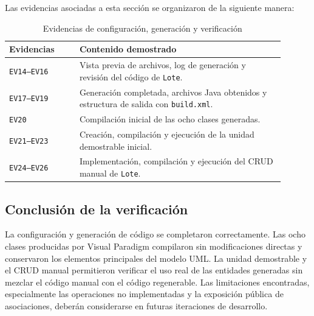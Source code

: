 Las evidencias asociadas a esta sección se organizaron de la siguiente manera:

\begin{table}[htbp]
\centering
\small
\caption{Evidencias de configuración, generación y verificación}
\begin{tabular}{|p{0.23\linewidth}|p{0.67\linewidth}|}
\hline
\textbf{Evidencias} & \textbf{Contenido demostrado} \\
\hline
\texttt{EV14--EV16} & Vista previa de archivos, log de generación y revisión del código de \texttt{Lote}. \\
\hline
\texttt{EV17--EV19} & Generación completada, archivos Java obtenidos y estructura de salida con \texttt{build.xml}. \\
\hline
\texttt{EV20} & Compilación inicial de las ocho clases generadas. \\
\hline
\texttt{EV21--EV23} & Creación, compilación y ejecución de la unidad demostrable inicial. \\
\hline
\texttt{EV24--EV26} & Implementación, compilación y ejecución del CRUD manual de \texttt{Lote}. \\
\hline
\end{tabular}
\end{table}

\subsection{Conclusión de la verificación}

La configuración y generación de código se completaron correctamente. Las ocho clases producidas por Visual Paradigm compilaron sin modificaciones directas y conservaron los elementos principales del modelo UML. La unidad demostrable y el CRUD manual permitieron verificar el uso real de las entidades generadas sin mezclar el código manual con el código regenerable. Las limitaciones encontradas, especialmente las operaciones no implementadas y la exposición pública de asociaciones, deberán considerarse en futuras iteraciones de desarrollo.
